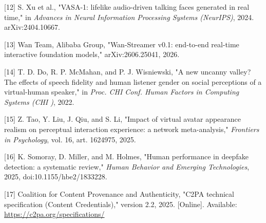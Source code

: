 \documentclass[
]{article}
\begin{document}
{[}12{]} S. Xu et al., "VASA-1: lifelike audio-driven talking faces
generated in real time," in \emph{Advances in Neural Information
Processing Systems (NeurIPS)}, 2024. arXiv:2404.10667.

{[}13{]} Wan Team, Alibaba Group, "Wan-Streamer v0.1: end-to-end
real-time interactive foundation models," arXiv:2606.25041, 2026.

{[}14{]} T. D. Do, R. P. McMahan, and P. J. Wisniewski, "A new uncanny
valley? The effects of speech fidelity and human listener gender on
social perceptions of a virtual-human speaker," in \emph{Proc. CHI Conf.
Human Factors in Computing Systems (CHI )}, 2022.

{[}15{]} Z. Tao, Y. Liu, J. Qiu, and S. Li, "Impact of virtual avatar
appearance realism on perceptual interaction experience: a network
meta-analysis," \emph{Frontiers in Psychology}, vol. 16, art. 1624975,
2025.

{[}16{]} K. Somoray, D. Miller, and M. Holmes, "Human performance in
deepfake detection: a systematic review," \emph{Human Behavior and
Emerging Technologies}, 2025, doi:10.1155/hbe2/1833228.

{[}17{]} Coalition for Content Provenance and Authenticity, "C2PA
technical specification (Content Credentials)," version 2.2, 2025.
{[}Online{]}. Available: \url{https://c2pa.org/specifications/}
\end{document}
